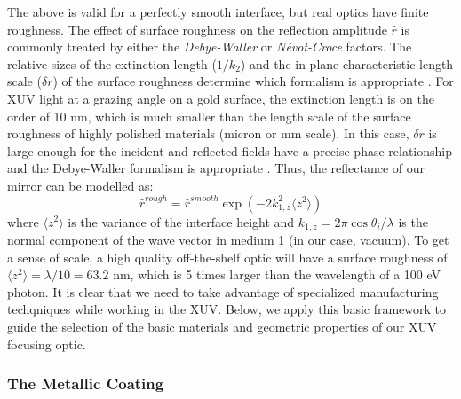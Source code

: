 The above is valid for a perfectly smooth interface, but real optics have finite roughness. The effect of surface roughness on the reflection amplitude $\hat{r}$ is commonly treated by either the \textit{Debye-Waller} or \textit{N\'evot-Croce} factors. The relative sizes of the extinction length ($1/k_2$) and the in-plane characteristic length scale ($\delta r$) of the surface roughness determine which formalism is appropriate \cite{sentenacStatisticalAspectsWave2009, gibaudSpecularReflectivitySmooth2009}. For XUV light at a grazing angle on a gold surface, the extinction length is on the order of 10 nm, which is much smaller than the length scale of the surface roughness of highly polished materials (micron or mm scale). In this case, $\delta r$ is large enough for the incident and reflected fields have a precise phase relationship and the Debye-Waller formalism is appropriate \cite{stoevReviewGrazingIncidence1999}. Thus, the reflectance of our mirror can be modelled as:
\begin{equation}
\hat{r}^{rough} = \hat{r}^{smooth} \exp \left( -2 k_{1,z}^2 \langle z^2 \rangle \right)
\label{eqn:DW_2}
\end{equation}
where $ \langle z^2 \rangle$ is the variance of the interface height and $k_{1,z} = 2 \pi \cos \theta_i / \lambda$ is the normal component of the wave vector in medium 1 (in our case, vacuum). To get a sense of scale, a high quality off-the-shelf optic will have a surface roughness of $\langle z^2 \rangle = \lambda/10 = 63.2 \text{ nm}$, which is 5 times larger than the wavelength of a 100 eV photon. It is clear that we need to take advantage of specialized manufacturing techqniques while working in the XUV. Below, we apply this basic framework to guide the selection of the basic materials and geometric properties of our XUV focusing optic. 

\subsubsection{The Metallic Coating}

